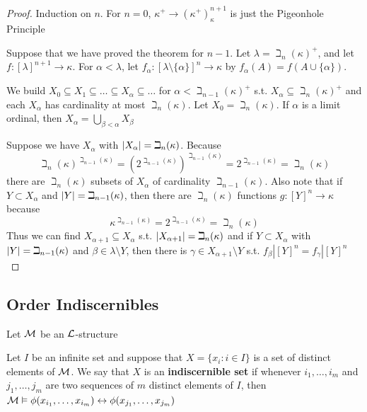 \documentclass[11pt]{article}
\begin{document}
\begin{proof}
Induction on \(n\). For \(n=0\), \(\kappa^+\to(\kappa^+)^{n+1}_\kappa\) is just the Pigeonhole Principle

Suppose that we have proved the theorem for \(n-1\). Let \(\lambda=\beth_n(\kappa)^+\), and
let \(f:[\lambda]^{n+1}\to\kappa\). For \(\alpha<\lambda\), let \(f_\alpha:[\lambda\setminus\{\alpha\}]^n\to\kappa\) by \(f_\alpha(A)=f(A\cup\{\alpha\})\).

We build \(X_0\subseteq X_1\subseteq\dots\subseteq X_\alpha\subseteq\dots\) for \(\alpha<\beth_{n-1}(\kappa)^+\) s.t. \(X_\alpha\subseteq\beth_n(\kappa)^+\) and each \(X_\alpha\) has
cardinality at most \(\beth_n(\kappa)\). Let \(X_0=\beth_n(\kappa)\). If \(\alpha\) is a limit ordinal,
then \(X_\alpha=\bigcup_{\beta<\alpha}X_\beta\)

Suppose we have \(X_\alpha\) with \(\abs{X_\alpha}=\beth_n(\kappa)\). Because
\begin{equation*}
\beth_n(\kappa)^{\beth_{n-1}(\kappa)}=(2^{\beth_{n-1}(\kappa)})^{\beth_{n-1}(\kappa)}=2^{\beth_{n-1}(\kappa)}=\beth_n(\kappa)
\end{equation*}
there are \(\beth_n(\kappa)\) subsets of \(X_\alpha\) of cardinality \(\beth_{n-1}(\kappa)\). Also note that
if \(Y\subset X_\alpha\) and \(\abs{Y}=\beth_{n-1}(\kappa)\), then there are \(\beth_n(\kappa)\) functions \(g:[Y]^n\to\kappa\)
because
\begin{equation*}
\kappa^{\beth_{n-1}(\kappa)}=2^{\beth_{n-1}(\kappa)}=\beth_n(\kappa)
\end{equation*}
Thus we can find \(X_{\alpha+1}\subseteq X_\alpha\) s.t. \(\abs{X_{\alpha+1}}=\beth_n(\kappa)\) and if \(Y\subset X_\alpha\)
with \(\abs{Y}=\beth_{n-1}(\kappa)\) and \(\beta\in\lambda\setminus Y\), then there is \(\gamma\in X_{\alpha+1}\setminus Y\) s.t.
\(f_\beta|[Y]^n=f_\gamma|[Y]^n\) \label{CANT UNDERSTAND}
\end{proof}
\subsection{Order Indiscernibles}
\label{sec:orge1c47ab}
Let \(\mathcal{M}\) be an \(\mathcal{L}\)-structure

\begin{definition}[]
Let \(I\) be an infinite set and suppose that \(X=\{x_i:i\in I\}\) is a set of distinct elements
of \(\mathcal{M}\). We say that \(X\) is an \textbf{indiscernible set} if whenever \(i_1,\dots,i_m\) and \(j_1,\dots,j_m\)
are two sequences of \(m\) distinct elements of \(I\),
then \(\mathcal{M}\vDash\phi(x_{i_1},\dots,x_{i_m})\leftrightarrow \phi(x_{j_1},\dots,x_{j_m})\)
\end{definition}
\end{document}
